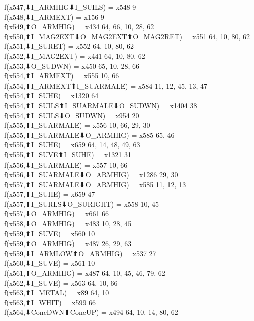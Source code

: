 f(x547,⬇I_ARMHIG⬇I_SUILS) = x548 {9} \\
f(x548,⬇I_ARMEXT) = x156 {9} \\
f(x549,⬆O_ARMHIG) = x434 {64, 66, 10, 28, 62} \\
f(x550,⬆I_MAG2EXT⬇O_MAG2EXT⬆O_MAG2RET) = x551 {64, 10, 80, 62} \\
f(x551,⬇I_SURET) = x552 {64, 10, 80, 62} \\
f(x552,⬇I_MAG2EXT) = x441 {64, 10, 80, 62} \\
f(x553,⬇O_SUDWN) = x450 {65, 10, 28, 66} \\
f(x554,⬆I_ARMEXT) = x555 {10, 66} \\
f(x554,⬆I_ARMEXT⬆I_SUARMALE) = x584 {11, 12, 45, 13, 47} \\
f(x554,⬆I_SUHE) = x1320 {64} \\
f(x554,⬆I_SUILS⬆I_SUARMALE⬇O_SUDWN) = x1404 {38} \\
f(x554,⬆I_SUILS⬇O_SUDWN) = x954 {20} \\
f(x555,⬆I_SUARMALE) = x556 {10, 66, 29, 30} \\
f(x555,⬆I_SUARMALE⬇O_ARMHIG) = x585 {65, 46} \\
f(x555,⬆I_SUHE) = x659 {64, 14, 48, 49, 63} \\
f(x555,⬆I_SUVE⬆I_SUHE) = x1321 {31} \\
f(x556,⬇I_SUARMALE) = x557 {10, 66} \\
f(x556,⬇I_SUARMALE⬇O_ARMHIG) = x1286 {29, 30} \\
f(x557,⬆I_SUARMALE⬇O_ARMHIG) = x585 {11, 12, 13} \\
f(x557,⬆I_SUHE) = x659 {47} \\
f(x557,⬆I_SURLS⬇O_SURIGHT) = x558 {10, 45} \\
f(x557,⬇O_ARMHIG) = x661 {66} \\
f(x558,⬇O_ARMHIG) = x483 {10, 28, 45} \\
f(x559,⬆I_SUVE) = x560 {10} \\
f(x559,⬆O_ARMHIG) = x487 {26, 29, 63} \\
f(x559,⬇I_ARMLOW⬆O_ARMHIG) = x537 {27} \\
f(x560,⬇I_SUVE) = x561 {10} \\
f(x561,⬆O_ARMHIG) = x487 {64, 10, 45, 46, 79, 62} \\
f(x562,⬇I_SUVE) = x563 {64, 10, 66} \\
f(x563,⬆I_METAL) = x89 {64, 10} \\
f(x563,⬆I_WHIT) = x599 {66} \\
f(x564,⬇ConcDWN⬆ConcUP) = x494 {64, 10, 14, 80, 62} \\
